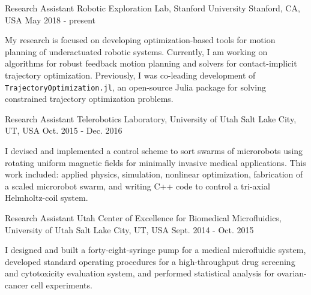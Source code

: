 

\begin{cventries}

  \cventry
    {Research Assistant} %
    {Robotic Exploration Lab, Stanford University} %
    {Stanford, CA, USA} %
    {May 2018 - present} %
    {
      \begin{cvitems} %
      My research is focused on developing optimization-based tools for motion planning of underactuated robotic systems. Currently, I am working on algorithms for robust feedback motion planning and solvers for contact-implicit trajectory optimization. Previously, I was co-leading development of \texttt{TrajectoryOptimization.jl}, an open-source Julia package for solving constrained trajectory optimization problems.
      \end{cvitems}
    }
    
  \cventry
    {Research Assistant} %
    {Telerobotics Laboratory, University of Utah} %
    {Salt Lake City, UT, USA} %
    {Oct. 2015 - Dec. 2016} %
    {
      \begin{cvitems} %
      I devised and implemented a control scheme to sort swarms of microrobots using rotating uniform magnetic fields for minimally invasive medical applications. This work included: applied physics, simulation, nonlinear optimization, fabrication of a scaled microrobot swarm, and writing C++ code to control a tri-axial Helmholtz-coil system.
      \end{cvitems}
    }
    
  \cventry
    {Research Assistant} %
    {Utah Center of Excellence for Biomedical Microfluidics, University of Utah} %
    {Salt Lake City, UT, USA} %
    {Sept. 2014 - Oct. 2015} %
    {
      \begin{cvitems} %
      I designed and built a forty-eight-syringe pump for a medical microfluidic system, developed standard operating procedures for a high-throughput drug screening and cytotoxicity evaluation system, and performed statistical analysis for ovarian-cancer cell experiments.
      \end{cvitems}
    }

\end{cventries}
